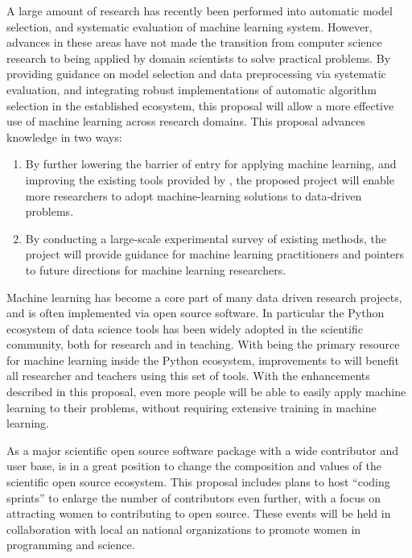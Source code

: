 A large amount of research has recently been performed into automatic model
selection, and systematic evaluation of machine learning system.
However, advances in these areas have not made the transition from computer
science research to being applied by domain scientists to solve practical
problems.
By providing guidance on model selection and data preprocessing via
systematic evaluation, and integrating robust implementations of automatic
algorithm selection in the established \sklearn{} ecosystem, this proposal
will allow a more effective use of machine learning across research domains.
%
\vspace{-3mm}
\vspace{-3mm}
This proposal advances knowledge in two ways:
\begin{enumerate}
    \item By further lowering the barrier of entry for applying machine
        learning, and improving the existing tools provided by \sklearn{}, the
        proposed project will enable more researchers to adopt machine-learning
        solutions to data-driven problems.
    \item By conducting a large-scale experimental survey of existing methods,
        the project will provide guidance for machine learning practitioners
        and pointers to future directions for machine learning researchers.
\end{enumerate}
%
\vspace{-6mm}
\vspace{-3mm}
Machine learning has become a core part of many data driven research projects,
and is often implemented via open source software.
In particular the Python ecosystem of data science tools has been widely
adopted in the scientific community, both for research and in teaching.
With \sklearn{} being the primary resource for machine learning inside
the Python ecosystem, improvements to \sklearn{} will benefit all researcher
and teachers using this set of tools.
With the enhancements described in this proposal, even more people
will be able to easily apply machine learning to their problems,
without requiring extensive training in machine learning.

As a major scientific open source software package with a wide contributor
and user base, \sklearn{} is in a great position to change
the composition and values of the scientific open source ecosystem.
This proposal includes plans to host ``coding sprints'' to enlarge the number
of contributors even further, with a focus on attracting women to contributing
to open source. These events will be held in collaboration with local an
national organizations to promote women in programming and science.
